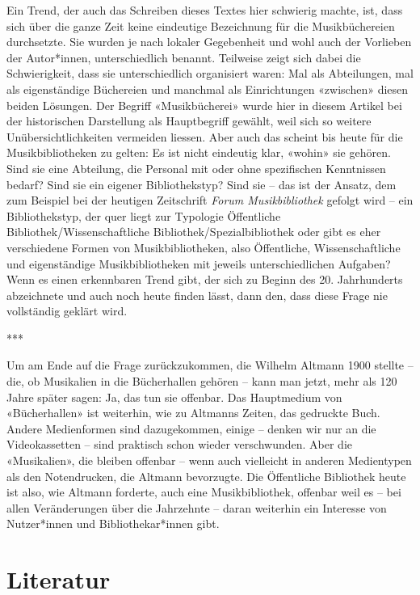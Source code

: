 \documentclass[a4paper,
fontsize=11pt,
oneside,
numbers=noperiodatend,
parskip=half-,
bibliography=totoc,
final
]{scrartcl}
\begin{document}
Ein Trend, der auch das Schreiben dieses Textes hier schwierig machte,
ist, dass sich über die ganze Zeit keine eindeutige Bezeichnung für die
Musikbüchereien durchsetzte. Sie wurden je nach lokaler Gegebenheit und
wohl auch der Vorlieben der Autor*innen, unterschiedlich benannt.
Teilweise zeigt sich dabei die Schwierigkeit, dass sie unterschiedlich
organisiert waren: Mal als Abteilungen, mal als eigenständige Büchereien
und manchmal als Einrichtungen «zwischen» diesen beiden Lösungen. Der
Begriff «Musikbücherei» wurde hier in diesem Artikel bei der
historischen Darstellung als Hauptbegriff gewählt, weil sich so weitere
Unübersichtlichkeiten vermeiden liessen. Aber auch das scheint bis heute
für die Musikbibliotheken zu gelten: Es ist nicht eindeutig klar,
«wohin» sie gehören. Sind sie eine Abteilung, die Personal mit oder ohne
spezifischen Kenntnissen bedarf? Sind sie ein eigener Bibliothekstyp?
Sind sie -- das ist der Ansatz, dem zum Beispiel bei der heutigen
Zeitschrift \emph{Forum Musikbibliothek} gefolgt wird -- ein
Bibliothekstyp, der quer liegt zur Typologie Öffentliche
Bibliothek/Wissenschaftliche Bibliothek/Spezialbibliothek oder gibt es
eher verschiedene Formen von Musikbibliotheken, also Öffentliche,
Wissenschaftliche und eigenständige Musikbibliotheken mit jeweils
unterschiedlichen Aufgaben? Wenn es einen erkennbaren Trend gibt, der
sich zu Beginn des 20. Jahrhunderts abzeichnete und auch noch heute
finden lässt, dann den, dass diese Frage nie vollständig geklärt wird.

***

Um am Ende auf die Frage zurückzukommen, die Wilhelm Altmann 1900
stellte -- die, ob Musikalien in die Bücherhallen gehören -- kann man
jetzt, mehr als 120 Jahre später sagen: Ja, das tun sie offenbar. Das
Hauptmedium von «Bücherhallen» ist weiterhin, wie zu Altmanns Zeiten,
das gedruckte Buch. Andere Medienformen sind dazugekommen, einige --
denken wir nur an die Videokassetten -- sind praktisch schon wieder
verschwunden. Aber die «Musikalien», die bleiben offenbar -- wenn auch
vielleicht in anderen Medientypen als den Notendrucken, die Altmann
bevorzugte. Die Öffentliche Bibliothek heute ist also, wie Altmann
forderte, auch eine Musikbibliothek, offenbar weil es -- bei allen
Veränderungen über die Jahrzehnte -- daran weiterhin ein Interesse von
Nutzer*innen und Bibliothekar*innen gibt.

\hypertarget{literatur}{%
\section{Literatur}\label{literatur}}
\end{document}
